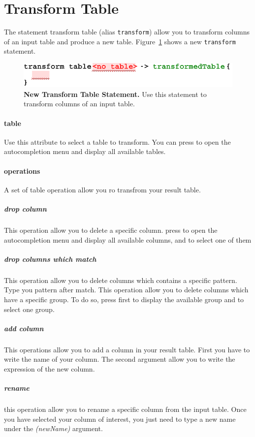 \section{Transform Table}
The statement transform table (alias \texttt{transform})  allow you to transform columns of an input table and produce a new table. Figure~\ref{fig:NewTransformTable} shows a new \texttt{transform} statement.

\begin{figure}
  \centering
  \includegraphics[width=\figWidthNarrow]{figures/NewTransformTable.pdf}
\caption[New Transform Table  Statement.]{\textbf{New Transform Table Statement.} Use this statement to transform columns of an input table.}
\label{fig:NewTransformTable}
\end{figure}

\paragraph{table}
Use this attribute to select a table to transform. You can press \keys{\crtl+\space} to open the autocompletion menu and display all available tables.

\paragraph{operations}
A set of table operation allow you ro transfrom your result table.

\subparagraph{drop column} This operation allow you to delete a specific column. press \keys{\crtl+\space} to open the autocompletion menu and display all available columns, and \key{\return} to select one of them 
\subparagraph{drop columns which match} This operation allow you to delete columns which contains a specific pattern. Type you pattern after match.
 This operation allow you to delete columns which have a specific group. To do so, press first  to display the available group and \key{\return} to select one group.
\subparagraph{add column}
This operations allow you to add a column in your result table. First you have to write the name of your column. The second argument allow you to write the expression of the new column.  
\subparagraph{rename} this operation allow you to rename a specific column from the input table. Once you have selected your column of interest, you just need to type a new name under the \textit{(newName)} argument.

